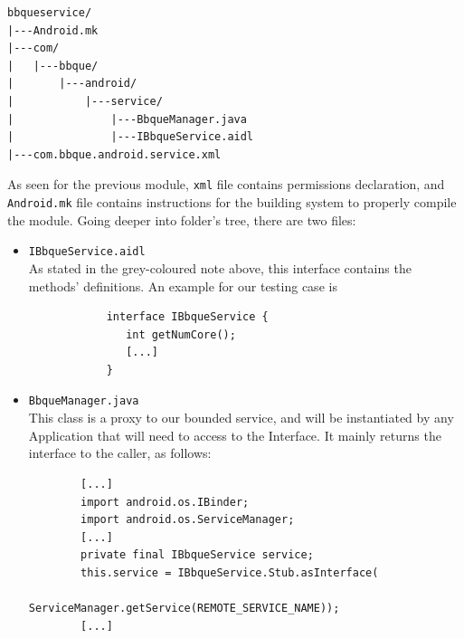 \begin{verbatim}
bbqueservice/
|---Android.mk
|---com/
|   |---bbque/
|       |---android/
|           |---service/
|               |---BbqueManager.java
|               |---IBbqueService.aidl
|---com.bbque.android.service.xml
\end{verbatim}
As seen for the previous module, \texttt{xml} file contains permissions declaration, and \texttt{Android.mk} file contains instructions for the building system to properly compile the module. Going deeper into folder's tree, there are two files:
\begin{itemize}
	\item \texttt{IBbqueService.aidl}\\
		As stated in the grey-coloured note above, this interface contains the methods' definitions. An example for our testing case is
		\begin{verbatim}
			interface IBbqueService {
			   int getNumCore();
			   [...]
			}
		\end{verbatim}
	\item \texttt{BbqueManager.java}\\
	This class is a proxy to our bounded service, and will be instantiated by any Application that will need to access to the Interface. It mainly returns the interface to the caller, as follows:
	\begin{verbatim}
		[...]
		import android.os.IBinder;
		import android.os.ServiceManager;
		[...]
		private final IBbqueService service;
		this.service = IBbqueService.Stub.asInterface(
		               ServiceManager.getService(REMOTE_SERVICE_NAME));
		[...]
	\end{verbatim}
\end{itemize}
